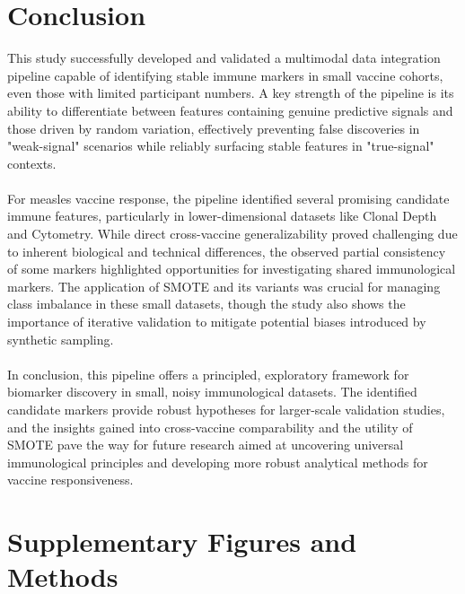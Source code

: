 \documentclass[12pt,a4paper]{report}
\begin{document}
\chapter{Conclusion}
\noindent
This study successfully developed and validated a multimodal data integration pipeline capable of identifying stable immune markers in small vaccine cohorts, even those with limited participant numbers. A key strength of the pipeline is its ability to differentiate between features containing genuine predictive signals and those driven by random variation, effectively preventing false discoveries in "weak-signal" scenarios while reliably surfacing stable features in "true-signal" contexts.\\
\\
For measles vaccine response, the pipeline identified several promising candidate immune features, particularly in lower-dimensional datasets like Clonal Depth and Cytometry. While direct cross-vaccine generalizability proved challenging due to inherent biological and technical differences, the observed partial consistency of some markers highlighted opportunities for investigating shared immunological markers. The application of SMOTE and its variants was crucial for managing class imbalance in these small datasets, though the study also shows the importance of iterative validation to mitigate potential biases introduced by synthetic sampling.\\
\\
In conclusion, this pipeline offers a principled, exploratory framework for biomarker discovery in small, noisy immunological datasets. The identified candidate markers provide robust hypotheses for larger-scale validation studies, and the insights gained into cross-vaccine comparability and the utility of SMOTE pave the way for future research aimed at uncovering universal immunological principles and developing more robust analytical methods for vaccine responsiveness.










\appendix

\chapter{Supplementary Figures and Methods}
\label{chap:dendrograms_and_feature_interpretations}
\end{document}

